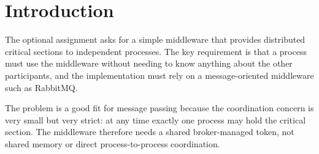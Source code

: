 \clearpage
\section{Introduction}

The optional assignment asks for a simple middleware that provides distributed
critical sections to independent processes. The key requirement is that a
process must use the middleware without needing to know anything about the
other participants, and the implementation must rely on a message-oriented
middleware such as RabbitMQ.

The problem is a good fit for message passing because the coordination concern
is very small but very strict: at any time exactly one process may hold the
critical section. The middleware therefore needs a shared broker-managed
token, not shared memory or direct process-to-process coordination.
